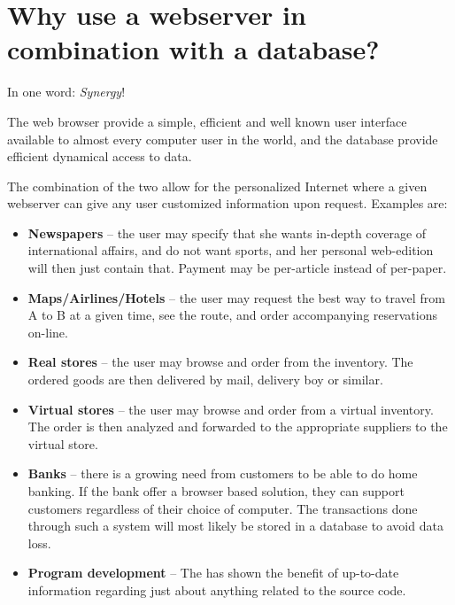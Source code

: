 \section{Why use a webserver in combination with a database?}
\label{sec:why-use-a-webserver-in-combination-with-a-database}

In one word: \textit{Synergy}!


The web browser provide a simple, efficient and
well known user interface available to almost every computer user in
the world, and the database provide efficient dynamical access to
data.

The combination of the two allow for the personalized Internet where a
given webserver can give any user customized information upon request.
Examples are:

\begin{itemize}
\item \textbf{Newspapers} -- the user may specify that she wants
  in-depth coverage of international affairs, and do not want sports,
  and her personal web-edition will then just contain that.  Payment
  may be per-article instead of per-paper.
  
\item \textbf{Maps/Airlines/Hotels} -- the user may request the best
  way to travel from A to B at a given time, see the route, and order
  accompanying reservations on-line.

\item \textbf{Real stores} -- the user may browse and order from the inventory.
  The ordered goods are then delivered by mail, delivery boy or
  similar.
  
\item \textbf{Virtual stores} -- the user may browse and order from a
  virtual inventory.  The order is then analyzed and forwarded to the
  appropriate suppliers to the virtual store.
  
\item \textbf{Banks} -- there is a growing need from customers to be
  able to do home banking.  If the bank offer a browser based
  solution, they can support customers regardless of their choice of
  computer.  The transactions done through such a system will most
  likely be stored in a database to avoid data loss.
  
\item \textbf{Program development} -- The
   has shown the
  benefit of up-to-date information regarding just about anything
  related to the source code.
\end{itemize}


